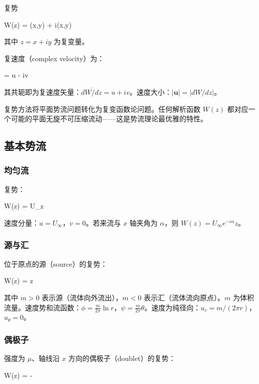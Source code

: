 \begin{mydefinition}{复势}
\begin{myformula}
W(z) = \phi(x,y) + i\psi(x,y)
\end{myformula}
其中 \(z = x + iy\) 为复变量。
\end{mydefinition}

复速度（complex velocity）为：
\begin{myformula}
 = u - iv
\end{myformula}

其共轭即为复速度矢量：\(\overline{dW/dz} = u + iv\)。速度大小：\(|\mathbf{u}| = |dW/dz|\)。

复势方法将平面势流问题转化为复变函数论问题。任何解析函数 \(W(z)\) 都对应一个可能的平面无旋不可压缩流动——这是势流理论最优雅的特性。

\subsection{基本势流}

\subsubsection{均匀流}

复势：
\begin{myformula}
W(z) = U_\infty z
\end{myformula}

速度分量：\(u = U_\infty\)，\(v = 0\)。若来流与 \(x\) 轴夹角为 \(\alpha\)，则 \(W(z) = U_\infty e^{-i\alpha}z\)。

\subsubsection{源与汇}

位于原点的源（source）的复势：
\begin{myformula}
W(z) = \ln z
\end{myformula}

其中 \(m > 0\) 表示源（流体向外流出），\(m < 0\) 表示汇（流体流向原点）。\(m\) 为体积流量。速度势和流函数：\(\phi = \frac{m}{2\pi}\ln r\)，\(\psi = \frac{m}{2\pi}\theta\)。速度为纯径向：\(u_r = m/(2\pi r)\)，\(u_\theta = 0\)。

\subsubsection{偶极子}

强度为 \(\mu\)、轴线沿 \(x\) 方向的偶极子（doublet）的复势：
\begin{myformula}
W(z) = -\frac{\mu}{2\pi}
\end{myformula}

